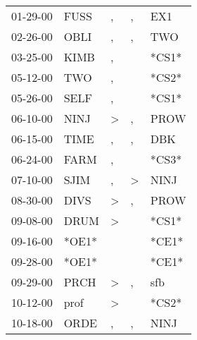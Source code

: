 \begin{supertabular}{p{0.07\textwidth}p{0.06\textwidth}p{0.02\textwidth}p{0.02\textwidth}p{0.06\textwidth}}
 01-29-00\textsuperscript{} &         FUSS\textsuperscript{} &             , &             , &            EX1\textsuperscript{} \\
 02-26-00\textsuperscript{} &         OBLI\textsuperscript{} &             , &             , &            TWO\textsuperscript{} \\
 03-25-00\textsuperscript{} &         KIMB\textsuperscript{} &             , &               &                            *CS1* \\
 05-12-00\textsuperscript{} &          TWO\textsuperscript{} &             , &               &                            *CS2* \\
 05-26-00\textsuperscript{} &         SELF\textsuperscript{} &             , &               &                            *CS1* \\
 06-10-00\textsuperscript{} &         NINJ\textsuperscript{} &  \textgreater &             , &           PROW\textsuperscript{} \\
 06-15-00\textsuperscript{} &         TIME\textsuperscript{} &             , &             , &            DBK\textsuperscript{} \\
 06-24-00\textsuperscript{} &         FARM\textsuperscript{} &             , &               &                            *CS3* \\
 07-10-00\textsuperscript{} &         SJIM\textsuperscript{} &             , &  \textgreater &           NINJ\textsuperscript{} \\
 08-30-00\textsuperscript{} &         DIVS\textsuperscript{} &  \textgreater &             , &           PROW\textsuperscript{} \\
 09-08-00\textsuperscript{} &         DRUM\textsuperscript{} &  \textgreater &               &                            *CS1* \\
 09-16-00\textsuperscript{} &                          *OE1* &               &               &                            *CE1* \\
 09-28-00\textsuperscript{} &                          *OE1* &               &               &                            *CE1* \\
 09-29-00\textsuperscript{} &         PRCH\textsuperscript{} &  \textgreater &             , &            sfb\textsuperscript{} \\
 10-12-00\textsuperscript{} &         prof\textsuperscript{} &  \textgreater &               &                            *CS2* \\
 10-18-00\textsuperscript{} &         ORDE\textsuperscript{} &             , &             , &           NINJ\textsuperscript{} \\

\end{supertabular}
